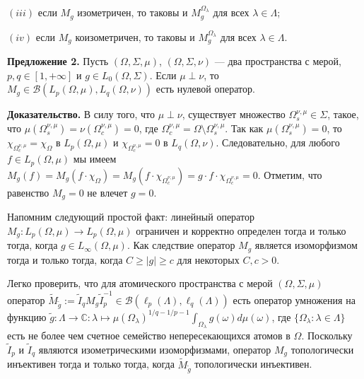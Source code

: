\documentclass[11pt,twoside]{article}
\begin{document}
$(iii)$ если $M_g$ изометричен, то таковы и $M_g^{\Omega_\lambda}$ для всех $\lambda\in\Lambda$;

$(iv)$ если $M_g$ коизометричен, то таковы и $M_g^{\Omega_\lambda}$ для всех $\lambda\in\Lambda$.

\textbf{Предложение 2.} Пусть $(\Omega,\Sigma,\mu)$, $(\Omega,\Sigma,\nu)$ --- два пространства с мерой, $p,q\in[1,+\infty]$ и $g\in L_0(\Omega,\Sigma)$. Если $\mu\perp\nu$, то $M_g\in\mathcal{B}(L_p(\Omega,\mu), L_q(\Omega,\nu))$ есть нулевой оператор.

\textbf{Доказательство.} В силу того, что $\mu\perp\nu$, существует множество $\Omega_s^{\nu,\mu}\in\Sigma$, такое, что $\mu(\Omega_s^{\nu,\mu})=\nu(\Omega_c^{\nu,\mu})=0$, где $\Omega_c^{\nu,\mu}=\Omega\setminus\Omega_s^{\nu,\mu}$. Так как $\mu(\Omega_s^{\nu,\mu})=0$, то  $\chi_{\Omega_c^{\nu,\mu}}=\chi_{\Omega}$ в $L_p(\Omega,\mu)$ и  $\chi_{\Omega_c^{\nu,\mu}}=0$ в $L_q(\Omega,\nu)$. Следовательно, для любого $f\in L_p(\Omega,\mu)$ мы имеем $M_g(f)=M_g(f\cdot \chi_{\Omega})=M_g(f\cdot \chi_{\Omega_c^{\nu,\mu}})=g\cdot f\cdot\chi_{\Omega_c^{\nu,\mu}}=0$. Отметим, что равенство  $M_g=0$ не влечет $g=0$.

























Напомним следующий простой факт: линейный оператор $M_g:L_p(\Omega,\mu)\to L_p(\Omega,\mu)$ ограничен и корректно определен тогда и только тогда, когда $g\in L_\infty(\Omega,\mu)$. Как следствие оператор $M_g$ является изоморфизмом тогда и только тогда, когда $C\geq |g|\geq c$ для некоторых $C,c>0$. 

Легко проверить, что для атомического пространства с мерой $(\Omega,\Sigma,\mu)$ оператор $\widetilde{M}_{\widetilde{g}}:=\widetilde{I}_q M_g\widetilde{I}_p^{-1}\in\mathcal{B}(\ell_p(\Lambda),\ell_q(\Lambda))$ есть оператор умножения на функцию  $\widetilde{g}:\Lambda\to\mathbb{C}:\lambda\mapsto\mu(\Omega_\lambda)^{1/q-1/p-1}\int_{\Omega_\lambda}g(\omega)d\mu(\omega)$, где $\{\Omega_\lambda:\lambda\in\Lambda\}$ есть не более чем счетное семейство непересекающихся атомов в $\Omega$. Поскольку $\widetilde{I}_p$ и $\widetilde{I}_q$  являются изометрическими изоморфизмами, оператор $M_g$ топологически инъективен тогда и только тогда, когда $\widetilde{M}_{\widetilde{g}}$ топологически инъективен. 
\end{document}
